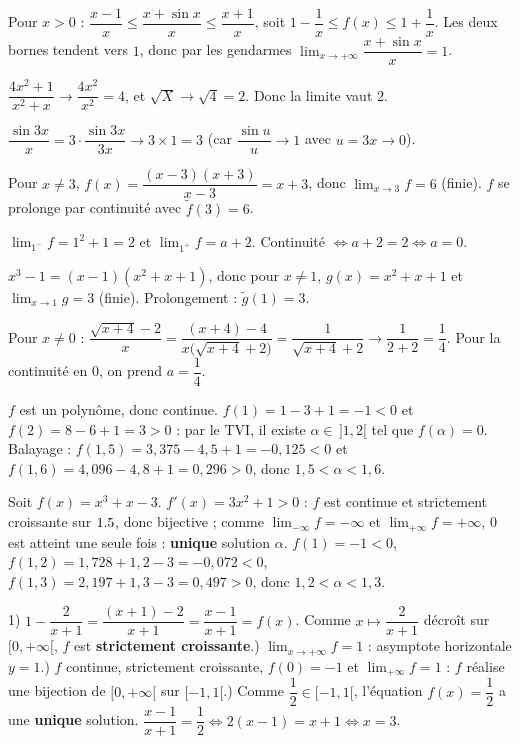 Pour $x>0$ : $\dfrac{x-1}{x}\le\dfrac{x+\sin x}{x}\le\dfrac{x+1}{x}$, soit $1-\dfrac1x\le f(x)\le1+\dfrac1x$. Les deux bornes tendent vers $1$, donc par les gendarmes $\displaystyle\lim_{x\to+\infty}\dfrac{x+\sin x}{x}=1$.

$\dfrac{4x^{2}+1}{x^{2}+x}\to\dfrac{4x^{2}}{x^{2}}=4$, et $\sqrt X\to\sqrt4=2$. Donc la limite vaut $2$.

$\dfrac{\sin 3x}{x}=3\cdot\dfrac{\sin 3x}{3x}\to3\times1=3$ (car $\dfrac{\sin u}{u}\to1$ avec $u=3x\to0$).

Pour $x\neq3$, $f(x)=\dfrac{(x-3)(x+3)}{x-3}=x+3$, donc $\displaystyle\lim_{x\to3}f=6$ (finie). $f$ se prolonge par continuité avec $\tilde f(3)=6$.

$\displaystyle\lim_{1^{-}}f=1^{2}+1=2$ et $\displaystyle\lim_{1^{+}}f=a+2$. Continuité $\Leftrightarrow a+2=2\Leftrightarrow a=0$.

$x^{3}-1=(x-1)(x^{2}+x+1)$, donc pour $x\neq1$, $g(x)=x^{2}+x+1$ et $\displaystyle\lim_{x\to1}g=3$ (finie). Prolongement : $\tilde g(1)=3$.

Pour $x\neq0$ : $\dfrac{\sqrt{x+4}-2}{x}=\dfrac{(x+4)-4}{x\big(\sqrt{x+4}+2\big)}=\dfrac1{\sqrt{x+4}+2}\to\dfrac1{2+2}=\dfrac14$. Pour la continuité en $0$, on prend $a=\dfrac14$.

$f$ est un polynôme, donc continue. $f(1)=1-3+1=-1<0$ et $f(2)=8-6+1=3>0$ : par le TVI, il existe $\alpha\in\,]1,2[$ tel que $f(\alpha)=0$. Balayage : $f(1{,}5)=3{,}375-4{,}5+1=-0{,}125<0$ et $f(1{,}6)=4{,}096-4{,}8+1=0{,}296>0$, donc $1{,}5<\alpha<1{,}6$.

Soit $f(x)=x^{3}+x-3$. $f'(x)=3x^{2}+1>0$ : $f$ est continue et strictement croissante sur $1.5$, donc bijective ; comme $\displaystyle\lim_{-\infty}f=-\infty$ et $\displaystyle\lim_{+\infty}f=+\infty$, $0$ est atteint une seule fois : \textbf{unique} solution $\alpha$. $f(1)=-1<0$, $f(1{,}2)=1{,}728+1{,}2-3=-0{,}072<0$, $f(1{,}3)=2{,}197+1{,}3-3=0{,}497>0$, donc $1{,}2<\alpha<1{,}3$.

1) $1-\dfrac2{x+1}=\dfrac{(x+1)-2}{x+1}=\dfrac{x-1}{x+1}=f(x)$. Comme $x\mapsto\dfrac2{x+1}$ décroît sur $[0,+\infty[$, $f$ est \textbf{strictement croissante}.) $\displaystyle\lim_{x\to+\infty}f=1$ : asymptote horizontale $y=1$.) $f$ continue, strictement croissante, $f(0)=-1$ et $\displaystyle\lim_{+\infty}f=1$ : $f$ réalise une bijection de $[0,+\infty[$ sur $[-1,1[$.) Comme $\dfrac12\in[-1,1[$, l'équation $f(x)=\dfrac12$ a une \textbf{unique} solution. $\dfrac{x-1}{x+1}=\dfrac12\Leftrightarrow 2(x-1)=x+1\Leftrightarrow x=3$.

